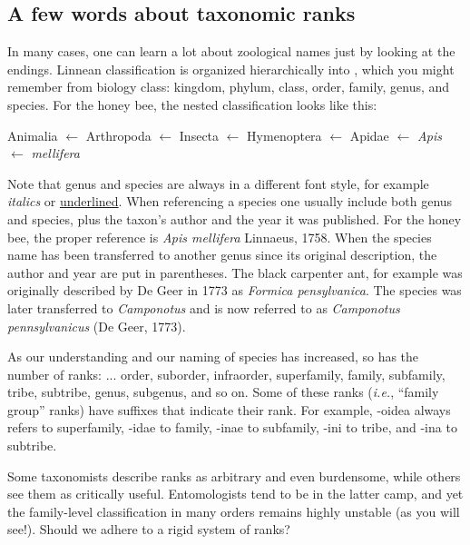 \subsection{A few words about taxonomic ranks}
In many cases, one can learn a lot about zoological names just by looking at the endings. Linnean classification is organized hierarchically into , which you might remember from biology class: kingdom, phylum, class, order, family, genus, and species. For the honey bee, the nested classification looks like this:\vspace{3mm}

Animalia $\leftarrow$ Arthropoda $\leftarrow$ Insecta $\leftarrow$ Hymenoptera $\leftarrow$ Apidae $\leftarrow$ \textit{Apis} $\leftarrow$ \textit{mellifera}\vspace{3mm}

\noindent{}Note that genus and species are always in a different font style, for example \textit{italics} or \underline{underlined}. When referencing a species one usually include both genus and species, plus the taxon's author and the year it was published. For the honey bee, the proper reference is \textit{Apis mellifera} Linnaeus, 1758. When the species name has been transferred to another genus since its original description, the author and year are put in parentheses. The black carpenter ant, for example was originally described by De Geer in 1773 as \textit{Formica pensylvanica}. The species was later transferred to \textit{Camponotus} and is now referred to as \textit{Camponotus pennsylvanicus} (De Geer, 1773).\vspace{3mm}

\noindent{}As our understanding and our naming of species has increased, so has the number of ranks: ... order, suborder, infraorder, superfamily, family, subfamily, tribe, subtribe, genus, subgenus, and so on. Some of these ranks (\textit{i.e.}, ``family group'' ranks) have suffixes that indicate their rank. For example, -oidea always refers to superfamily, -idae to family, -inae to subfamily, -ini to tribe, and -ina to subtribe.

\begin{theo}[ranks] 
{}Some taxonomists describe ranks as arbitrary and even burdensome, while others see them as critically useful. Entomologists tend to be in the latter camp, and yet the family-level classification in many orders remains highly unstable (as you will see!). Should we adhere to a rigid system of ranks? \end{theo}

